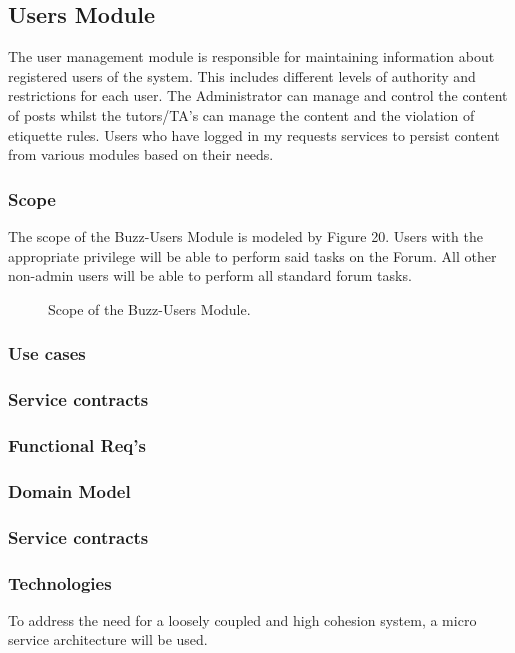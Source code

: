 \documentclass[12pt]{article}
\begin{document}
\newpage

\subsection{Users Module}
\par{The user management module is responsible for maintaining information about registered users of the system. This includes different levels of authority and restrictions for each user. The Administrator can manage and control the content of posts whilst the tutors/TA's can manage the content and the violation of etiquette rules. Users who have logged in my requests services to persist content from various modules based on their needs.}
\subsubsection{Scope}
\par{The scope of the Buzz-Users Module is modeled by Figure 20. Users with the appropriate privilege will be able to perform said tasks on the Forum. All other non-admin users will be able to perform all standard forum tasks.}

\begin{figure}[h]
\iffalse\texttt{[image: Diagrams/scopeUsers.jpeg]}\fi
\caption{Scope of the Buzz-Users Module.}
\label{Use-case: Buzz-Users Module}
\end{figure}

\subsubsection{Use cases}
\subsubsection{Service contracts}
\subsubsection{Functional Req's}
\subsubsection{Domain Model}

\subsubsection{Service contracts}

\subsubsection{Technologies}
\par{ To address the need for a loosely coupled and high cohesion system, a micro service architecture will be used. }
\end{document}

